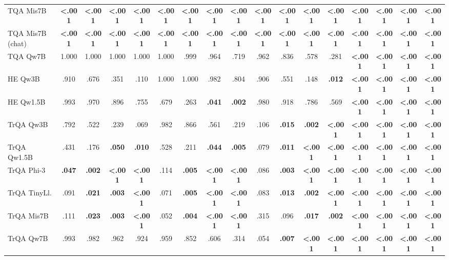 \begin{table}[H]
{\begin{tabular}{lcccccccccccccccc}
TQA Mis7B & \textbf{<.001} & \textbf{<.001} & \textbf{<.001} & \textbf{<.001} & \textbf{<.001} & \textbf{<.001} & \textbf{<.001} & \textbf{<.001} & \textbf{<.001} & \textbf{<.001} & \textbf{<.001} & \textbf{<.001} & \textbf{<.001} & \textbf{<.001} & \textbf{<.001} & \textbf{<.001} \\
TQA Mis7B (chat) & \textbf{<.001} & \textbf{<.001} & \textbf{<.001} & \textbf{<.001} & \textbf{<.001} & \textbf{<.001} & \textbf{<.001} & \textbf{<.001} & \textbf{<.001} & \textbf{<.001} & \textbf{<.001} & \textbf{<.001} & \textbf{<.001} & \textbf{<.001} & \textbf{<.001} & \textbf{<.001} \\
TQA Qw7B & 1.000 & 1.000 & 1.000 & 1.000 & 1.000 & .999 & .964 & .719 & .962 & .836 & .578 & .281 & \textbf{<.001} & \textbf{<.001} & \textbf{<.001} & \textbf{<.001} \\
HE Qw3B & .910 & .676 & .351 & .110 & 1.000 & 1.000 & .982 & .804 & .906 & .551 & .148 & \textbf{.012} & \textbf{<.001} & \textbf{<.001} & \textbf{<.001} & \textbf{<.001} \\
HE Qw1.5B & .993 & .970 & .896 & .755 & .679 & .263 & \textbf{.041} & \textbf{.002} & .980 & .918 & .786 & .569 & \textbf{<.001} & \textbf{<.001} & \textbf{<.001} & \textbf{<.001} \\
TrQA Qw3B & .792 & .522 & .239 & .069 & .982 & .866 & .561 & .219 & .106 & \textbf{.015} & \textbf{.002} & \textbf{<.001} & \textbf{<.001} & \textbf{<.001} & \textbf{<.001} & \textbf{<.001} \\
TrQA Qw1.5B & .431 & .176 & \textbf{.050} & \textbf{.010} & .528 & .211 & \textbf{.044} & \textbf{.005} & .079 & \textbf{.011} & \textbf{<.001} & \textbf{<.001} & \textbf{<.001} & \textbf{<.001} & \textbf{<.001} & \textbf{<.001} \\
TrQA Phi-3 & \textbf{.047} & \textbf{.002} & \textbf{<.001} & \textbf{<.001} & .114 & \textbf{.005} & \textbf{<.001} & \textbf{<.001} & .086 & \textbf{.003} & \textbf{<.001} & \textbf{<.001} & \textbf{<.001} & \textbf{<.001} & \textbf{<.001} & \textbf{<.001} \\
TrQA TinyLl. & .091 & \textbf{.021} & \textbf{.003} & \textbf{<.001} & .071 & \textbf{.005} & \textbf{<.001} & \textbf{<.001} & .083 & \textbf{.013} & \textbf{.002} & \textbf{<.001} & \textbf{<.001} & \textbf{<.001} & \textbf{<.001} & \textbf{<.001} \\
TrQA Mis7B & .111 & \textbf{.023} & \textbf{.003} & \textbf{<.001} & .052 & \textbf{.004} & \textbf{<.001} & \textbf{<.001} & .315 & .096 & \textbf{.017} & \textbf{.002} & \textbf{<.001} & \textbf{<.001} & \textbf{<.001} & \textbf{<.001} \\
TrQA Qw7B & .993 & .982 & .962 & .924 & .959 & .852 & .606 & .314 & .054 & \textbf{.007} & \textbf{<.001} & \textbf{<.001} & \textbf{<.001} & \textbf{<.001} & \textbf{<.001} & \textbf{<.001} \\
\bottomrule
\end{tabular}}
\end{table}


